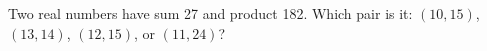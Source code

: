 Two real numbers have sum 27 and product 182. Which pair is it: $(10,15)$, $(13,14)$, $(12,15)$, or $(11,24)$?
